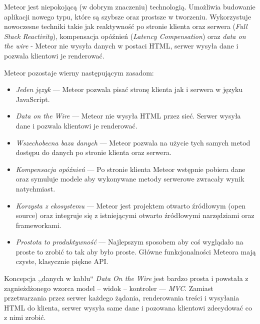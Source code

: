 Meteor jest niepokojącą (w dobrym znaczeniu) technologią. Umożliwia budowanie aplikacji nowego typu, które są szybsze oraz prostsze w tworzeniu. Wykorzystuje nowoczesne techniki takie jak reaktywność po stronie klienta oraz serwera (\textit{Full Stack Reactivity}), kompensacja opóźnień (\textit{Latency Compensation}) oraz \textit{data on the wire} - Meteor nie wysyła danych w postaci HTML, serwer wysyła dane i pozwala klientowi je renderować\cite{strack15}.


Meteor pozostaje wierny następującym zasadom\cite{meteorDocs}: 
\begin{itemize}
 \item \textit{Jeden język} --- Meteor pozwala pisać stronę klienta jak i serwera w języku JavaScript.
 \item \textit{Data on the Wire} --- Meteor nie wysyła HTML przez sieć. Serwer wysyła dane i pozwala klientowi je renderować.
 \item \textit{Wszechobecna baza danych} --- Meteor pozwala na użycie tych samych metod dostępu do danych po stronie klienta oraz serwera.
 \item \textit{Kompensacja opóźnień} --- Po stronie klienta Meteor wstępnie pobiera dane oraz symuluje modele aby wykonywane metody serwerowe zwracały wynik natychmiast.
 \item \textit{Korzysta z ekosystemu} --- Meteor jest projektem otwarto źródłowym (open source) oraz integruje się z istniejącymi otwarto źródłowymi narzędziami oraz frameworkami.
 \item \textit{Prostota to produktywność} --- Najlepszym sposobem aby coś wyglądało na proste to zrobić to tak aby było proste. Główne funkcjonalności Meteora mają czyste, klasycznie piękne API.
\end{itemize}

Koncepcja ,,danych w kablu`` \emph{Data On the Wire} jest bardzo prosta i powstała z zagnieżdżonego wzorca model -- widok -- kontroler --- \textit{MVC}. Zamiast przetwarzania przez serwer każdego żądania, renderowania treści i wysyłania HTML do klienta, serwer wysyła same dane i pozowana klientowi zdecydować co z nimi zrobić\cite{strack15}.


